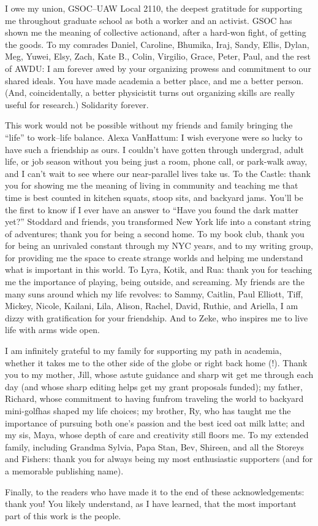 I owe my union, GSOC--UAW Local 2110, the deepest gratitude for supporting me throughout graduate school as both a worker and an activist. 
GSOC has shown me the meaning of collective action{\emdash}and, after a hard-won fight, of getting the goods.
To my comrades Daniel, Caroline, Bhumika, Iraj, Sandy, Ellis, Dylan, Meg, Yuwei, Elsy, Zach, Kate B., Colin, Virgilio, Grace, Peter, Paul, and the rest of AWDU: I am forever awed by your organizing prowess and commitment to our shared ideals.
You have made academia a better place, and me a better person. 
(And, coincidentally, a better physicist{\emdash}it turns out organizing skills are really useful for research.)
Solidarity forever.

This work would not be possible without my friends and family bringing the ``life'' to work--life balance.
Alexa VanHattum: I wish everyone were so lucky to have such a friendship as ours.
I couldn't have gotten through undergrad, adult life, or job season without you being just a room, phone call, or park-walk away, and I can't wait to see where our near-parallel lives take us.
To the Castle: thank you for showing me the meaning of living in community and teaching me that time is best counted in kitchen squats, stoop sits, and backyard jams.
You'll be the first to know if I ever have an answer to ``Have you found the dark matter yet?''
Stoddard and friends, you transformed New York life into a constant string of adventures; thank you for being a second home.
To my book club, thank you for being an unrivaled constant through my NYC years, and to my writing group, for providing me the space to create strange worlds and helping me understand what is important in this world.
To Lyra, Kotik, and Rua: thank you for teaching me the importance of playing, being outside, and screaming.
My friends are the many suns around which my life revolves: to Sammy, Caitlin, Paul Elliott, Tiff, Mickey, Nicole, Kailani, Lila, Alison, Rachel, David, Ruthie, and Ariella, I am dizzy with gratification for your friendship.
And to Zeke, who inspires me to live life with arms wide open.

I am infinitely grateful to my family for supporting my path in academia, whether it takes me to the other side of the globe or right back home (!).
Thank you to my mother, Jill, whose astute guidance and sharp wit get me through each day (and whose sharp editing helps get my grant proposals funded); my father, Richard, whose commitment to having fun{\emdash}from traveling the world to backyard mini-golf{\emdash}has shaped my life choices; my brother, Ry, who has taught me the importance of pursuing both one's passion and the best iced oat milk latte; and my sis, Maya, whose depth of care and creativity still floors me.
To my extended family, including Grandma Sylvia, Papa Stan, Bev, Shireen, and all the Storeys and Fishers: thank you for always being my most enthusiastic supporters (and for a memorable publishing name).

Finally, to the readers who have made it to the end of these acknowledgements: thank you!
You likely understand, as I have learned, that the most important part of this work is the people.